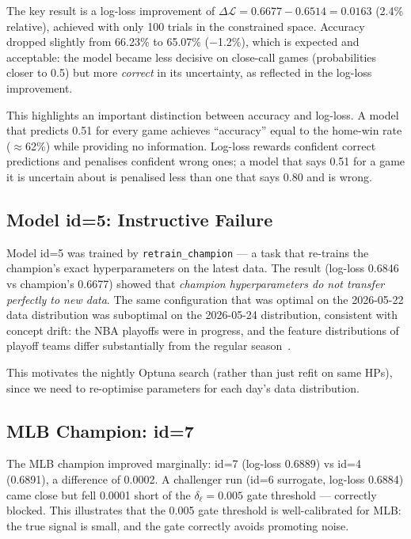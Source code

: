 \documentclass[conference]{IEEEtran}
\begin{document}
The key result is a log-loss improvement of
$\Delta\mathcal{L} = 0.6677 - 0.6514 = 0.0163$ (2.4\% relative),
achieved with only 100 trials in the constrained space.  Accuracy
dropped slightly from 66.23\% to 65.07\% ($-$1.2\%), which is
expected and acceptable: the model became less decisive on
close-call games (probabilities closer to 0.5) but more
\emph{correct} in its uncertainty, as reflected in the log-loss
improvement.

This highlights an important distinction between accuracy and
log-loss.  A model that predicts 0.51 for every game achieves
``accuracy'' equal to the home-win rate ($\approx$62\%) while
providing no information.  Log-loss rewards confident correct
predictions and penalises confident wrong ones; a model that says
0.51 for a game it is uncertain about is penalised less than one that
says 0.80 and is wrong.

\subsection{Model id=5: Instructive Failure}

Model id=5 was trained by \texttt{retrain\_champion} — a task that
re-trains the champion's exact hyperparameters on the latest data.
The result (log-loss 0.6846 vs champion's 0.6677) showed that
\emph{champion hyperparameters do not transfer perfectly to new data}.
The same configuration that was optimal on the 2026-05-22 data
distribution was suboptimal on the 2026-05-24 distribution, consistent
with concept drift: the NBA playoffs were in progress, and the feature
distributions of playoff teams differ substantially from the regular
season~\cite{papagelis2013}.

This motivates the nightly Optuna search (rather than just refit on
same HPs), since we need to re-optimise parameters for each day's
data distribution.

\subsection{MLB Champion: id=7}

The MLB champion improved marginally:
id=7 (log-loss 0.6889) vs id=4 (0.6891), a difference of 0.0002.
A challenger run (id=6 surrogate, log-loss 0.6884) came close but
fell 0.0001 short of the $\delta_\ell=0.005$ gate threshold —
correctly blocked.  This illustrates that the 0.005 gate threshold
is well-calibrated for MLB: the true signal is small, and the gate
correctly avoids promoting noise.
\end{document}
